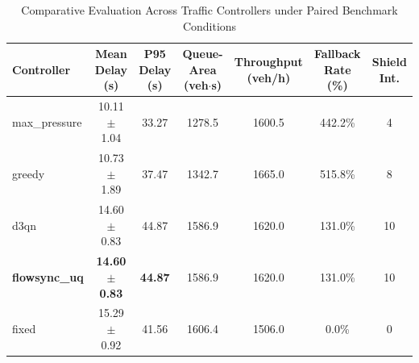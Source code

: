 \begin{table}[t]
\centering
\caption{Comparative Evaluation Across Traffic Controllers under Paired Benchmark Conditions}
\label{tab:benchmark_comparison}
\begin{tabular}{lcccccc}
\toprule
\textbf{Controller} & \textbf{Mean Delay (s)} & \textbf{P95 Delay (s)} & \textbf{Queue-Area (veh$\cdot$s)} & \textbf{Throughput (veh/h)} & \textbf{Fallback Rate (\%)} & \textbf{Shield Int.} \\
\midrule
max_pressure & 10.11 $\pm$ 1.04 & 33.27 & 1278.5 & 1600.5 & 442.2\% & 4 \\
greedy & 10.73 $\pm$ 1.89 & 37.47 & 1342.7 & 1665.0 & 515.8\% & 8 \\
d3qn & 14.60 $\pm$ 0.83 & 44.87 & 1586.9 & 1620.0 & 131.0\% & 10 \\
\textbf{flowsync_uq} & \textbf{14.60 $\pm$ 0.83} & \textbf{44.87} & 1586.9 & 1620.0 & 131.0\% & 10 \\
fixed & 15.29 $\pm$ 0.92 & 41.56 & 1606.4 & 1506.0 & 0.0\% & 0 \\
\bottomrule
\end{tabular}
\end{table}